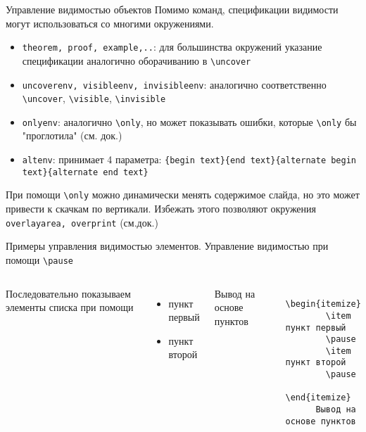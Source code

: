 \documentclass{beamer}
\newcommand{\bs}{\textbackslash}
\begin{document}
\begin{frame}[fragile]{Управление видимостью объектов}
  Помимо команд, спецификации видимости могут использоваться со многими окружениями.
  \begin{itemize}
    \item \texttt{theorem, proof, example,..}: для большинства окружений указание спецификации аналогично оборачиванию в \texttt{\bs uncover}
    \item \texttt{uncoverenv, visibleenv, invisibleenv}: аналогично соответственно \texttt{\bs uncover}, \texttt{\bs visible}, \texttt{\bs invisible}
    \item \texttt{onlyenv}: аналогично \texttt{\bs only}, но может показывать ошибки, которые \texttt{\bs only} бы "проглотила" (см. док.)
    \item \texttt{altenv}: принимает 4 параметра: \texttt{\{begin text\}\{end text\}\{alternate begin text\}\{alternate end text\}}
  \end{itemize}
  При помощи \texttt{\bs only} можно динамически менять содержимое слайда, но это может привести к скачкам по вертикали. Избежать этого позволяют окружения \texttt{overlayarea, overprint} (см.док.)
\end{frame}

\begin{frame}{
    Примеры управления видимостью элементов.
  }{
    Управление видимостью при помощи \texttt{\bs pause}
  }
  \begin{columns}
      Последовательно показываем элементы списка при помощи 
      \begin{itemize}
        \item пункт первый
        \pause
        \item пункт второй
        \pause
      \end{itemize}
      {Вывод на основе пунктов}
      \onslide
      \begin{verbatim}
      \begin{itemize}
        \item пункт первый
        \pause
        \item пункт второй
        \pause
      \end{itemize}
      Вывод на основе пунктов
      \end{verbatim}
  \end{columns}
\end{frame}
\end{document}
